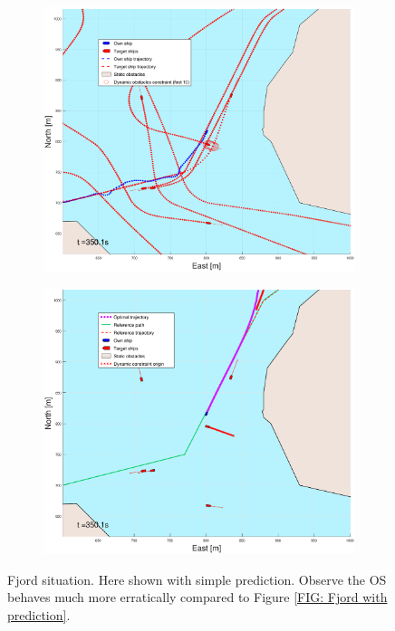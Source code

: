 \begin{figure}[ht!]
\begin{subfigure}[b]{0.499\textwidth}
    \end{subfigure}
    \hfill
    \\
    \begin{subfigure}[b]{0.49\textwidth}
        \centering
        \includegraphics[width=\textwidth]{Images/Figures/Trheimfjord/_Simple_1fig1_time=350}
    \end{subfigure}
    \hfill
    \begin{subfigure}[b]{0.499\textwidth}
        \centering
        \includegraphics[width=\textwidth]{Images/Figures/Trheimfjord/_Simple_1fig999_time=350}
    \end{subfigure}
    \hfill
    \caption{Fjord situation. Here shown with simple prediction. Observe the \gls{OS} behaves much more erratically compared to Figure \ref{FIG: Fjord with prediction}.}
\end{figure}


